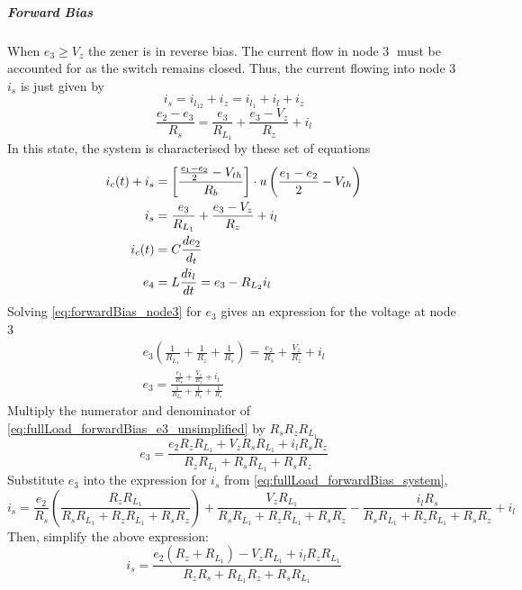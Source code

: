 \subparagraph{Forward Bias}
When $e_3 \geq V_z$ the zener is in reverse bias. The current flow in node \textcircled{3} must be accounted for as the switch remains closed. Thus, the current flowing into node \textcircled{3} $i_s$ is just given by $$i_s = i_{l_{12}} + i_z = i_{l_1} + i_l + i_z$$
\begin{equation}
	\frac{e_2 - e_3}{R_s} = \frac{e_3}{R_{L_1}} + \frac{e_3 - V_z}{R_z} + i_l
	\label{eq:forwardBias_node3}
\end{equation}
In this state, the system is characterised by these set of equations
\begin{align}
	i_c(t) + i_s &= \left[\frac{\frac{e_1 - e_2}{2} - V_{th}}{R_b} \right]\cdot u\left(\frac{e_1 - e_2}{2} - V_{th} \right) \\
	i_s &= \frac{e_3}{R_{L_1}} + \frac{e_3 - V_z}{R_z} + i_l \\
	i_c(t) &= C \frac{de_2}{d_t} \\
	e_4 &= L\frac{di_l}{dt} = e_3 - R_{L_2}i_l
	\label{eq:fullLoad_forwardBias_system}
\end{align}
Solving \eqref{eq:forwardBias_node3} for $e_3$ gives an expression for the voltage at node \textcircled{3}
\begin{equation}
\begin{split}
	e_3\left(\frac{1}{R_{L_1}} + \frac{1}{R_z} + \frac{1}{R_s}\right) = \frac{e_2}{R_s} + \frac{V_z}{R_z} + i_l \\
		e_3 = \frac{\frac{e_2}{R_s} + \frac{V_z}{R_z} + i_l}{\frac{1}{R_{L_1}} + \frac{1}{R_z} + \frac{1}{R_s}}
\end{split}
\label{eq:fullLoad_forwardBias_e3_unsimplified}
\end{equation}
Multiply the numerator and denominator of \eqref{eq:fullLoad_forwardBias_e3_unsimplified} by  $R_sR_zR_{L_1}$
\begin{equation}
 e_3 = \frac{e_2 R_z R_{L_1} + V_z R_s R_{L_1} + i_l R_s R_z}{R_z R_{L_1} + R_s R_{L_1} + R_s R_z}
\label{eq:fullLoad_forwardBias_e3}
\end{equation}
Substitute $e_3$ into the expression for $i_s$ from \eqref{eq:fullLoad_forwardBias_system},
\begin{equation}
i_s = \frac{e_2}{R_s} \left(\frac{R_z R_{L_1}}{R_s R_{L_1} + R_z R_{L_1} + R_s R_z}\right) + \frac{V_z R_{L_1}}{R_s R_{L_1} + R_z R_{L_1} + R_s R_z} - \frac{i_l R_s}{R_s R_{L_1} + R_z R_{L_1} + R_s R_z} + i_l
\end{equation}
Then, simplify the above expression:
\begin{equation}
i_s = \frac{e_2 (R_z + R_{L_1}) - V_z R_{L_1} + i_l R_z R_{L_1}}{R_z R_s + R_{L_1} R_z + R_s R_{L_1}}
\end{equation}
